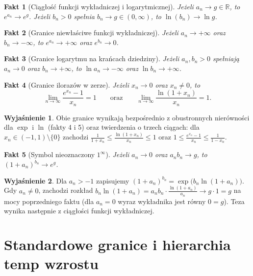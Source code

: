 \documentclass[11pt, a4paper]{article}
\theoremstyle{plain}
\newtheorem{fakt}{Fakt}
\theoremstyle{definition}
\newtheorem*{wyjasnienie}{Wyjaśnienie}
\begin{document}
\begin{fakt}[Ciągłość funkcji wykładniczej i logarytmicznej]
Jeżeli $a_n \to g \in \mathbb{R}$, to $e^{a_n} \to e^g$. Jeżeli $b_n > 0$ spełnia $b_n \to g \in (0, \infty)$, to $\ln(b_n) \to \ln g$.
\end{fakt}

\begin{fakt}[Granice niewłaściwe funkcji wykładniczej]
Jeżeli $a_n \to +\infty$ oraz $b_n \to -\infty$, to $e^{a_n} \to +\infty$ oraz $e^{b_n} \to 0$.
\end{fakt}

\begin{fakt}[Granice logarytmu na krańcach dziedziny]
Jeżeli $a_n, b_n > 0$ spełniają $a_n \to 0$ oraz $b_n \to +\infty$, to $\ln a_n \to -\infty$ oraz $\ln b_n \to +\infty$.
\end{fakt}

\begin{fakt}[Granice ilorazów w zerze]
Jeżeli $x_n \to 0$ oraz $x_n \neq 0$, to
\[
\lim_{n\to\infty} \frac{e^{x_n} - 1}{x_n} = 1 \qquad \text{oraz} \qquad \lim_{n\to\infty} \frac{\ln(1 + x_n)}{x_n} = 1.
\]
\end{fakt}

\begin{wyjasnienie}
Obie granice wynikają bezpośrednio z obustronnych nierówności dla $\exp$ i $\ln$ (fakty 4 i 5) oraz twierdzenia o trzech ciągach: dla $x_n \in (-1, 1) \setminus \{0\}$ zachodzi $\frac{1}{1 + x_n} \leqslant \frac{\ln(1 + x_n)}{x_n} \leqslant 1$ oraz $1 \leqslant \frac{e^{x_n} - 1}{x_n} \leqslant \frac{1}{1 - x_n}$.
\end{wyjasnienie}

\begin{fakt}[Symbol nieoznaczony $1^\infty$]
Jeżeli $a_n \to 0$ oraz $a_n b_n \to g$, to $(1 + a_n)^{b_n} \to e^g$.
\end{fakt}

\begin{wyjasnienie}
Dla $a_n > -1$ zapisujemy $(1 + a_n)^{b_n} = \exp\bigl(b_n \ln(1 + a_n)\bigr)$. Gdy $a_n \neq 0$, zachodzi rozkład $b_n \ln(1 + a_n) = a_n b_n \cdot \frac{\ln(1 + a_n)}{a_n} \to g \cdot 1 = g$ na mocy poprzedniego faktu (dla $a_n = 0$ wyraz wykładnika jest równy $0 = g$). Teza wynika następnie z ciągłości funkcji wykładniczej.
\end{wyjasnienie}

\section{Standardowe granice i hierarchia temp wzrostu}
\end{document}
